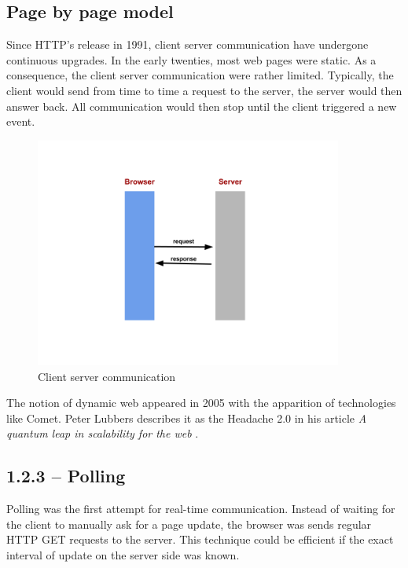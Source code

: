 \subsection{Page by page model}

Since HTTP's release in 1991, client server communication have undergone continuous upgrades. In the early twenties, most web pages were static. As a consequence, the client server communication were rather limited. Typically, the client would send from time to time a request to the server, the server would then answer back. All communication would then stop until the client triggered a new event.\\

\begin{figure}[htbp]
	\centering
		\includegraphics[width=0.9\textwidth]{./Figures/client_server_communication.png}
	\caption[client_server_communication]{Client server communication}
	\label{fig:client_server_communication}
\end{figure}

The notion of dynamic web appeared in 2005 with the apparition of technologies like Comet. Peter Lubbers describes it as the Headache 2.0 in his article \textit{A quantum leap in scalability for the web} \citep{Reference32}.\\

\subsection{1.2.3 – Polling}

Polling was the first attempt for real-time communication. Instead of waiting for the client to manually ask for a page update, the browser was sends regular HTTP GET requests to the server. This technique could be efficient if the exact interval of update on the server side was known.\\

